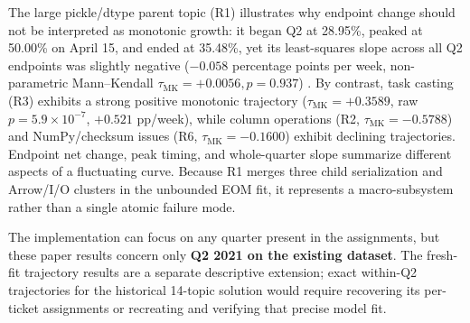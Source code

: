 The large pickle/dtype parent topic (R1) illustrates why endpoint change should not be interpreted as monotonic growth: it began Q2 at 28.95\%, peaked at 50.00\% on April 15, and ended at 35.48\%, yet its least-squares slope across all Q2 endpoints was slightly negative ($-0.058$ percentage points per week, non-parametric Mann--Kendall $\tau_{\text{MK}} = +0.0056, p = 0.937$) \cite{mann1945nonparametric}. By contrast, task casting (R3) exhibits a strong positive monotonic trajectory ($\tau_{\text{MK}} = +0.3589$, raw $p = 5.9 \times 10^{-7}$, $+0.521$ pp/week), while column operations (R2, $\tau_{\text{MK}} = -0.5788$) and NumPy/checksum issues (R6, $\tau_{\text{MK}} = -0.1600$) exhibit declining trajectories. Endpoint net change, peak timing, and whole-quarter slope summarize different aspects of a fluctuating curve. Because R1 merges three child serialization and Arrow/I/O clusters in the unbounded EOM fit, it represents a macro-subsystem rather than a single atomic failure mode.



The implementation can focus on any quarter present in the assignments, but these paper results concern only \textbf{Q2 2021 on the existing dataset}. The fresh-fit trajectory results are a separate descriptive extension; exact within-Q2 trajectories for the historical 14-topic solution would require recovering its per-ticket assignments or recreating and verifying that precise model fit.
